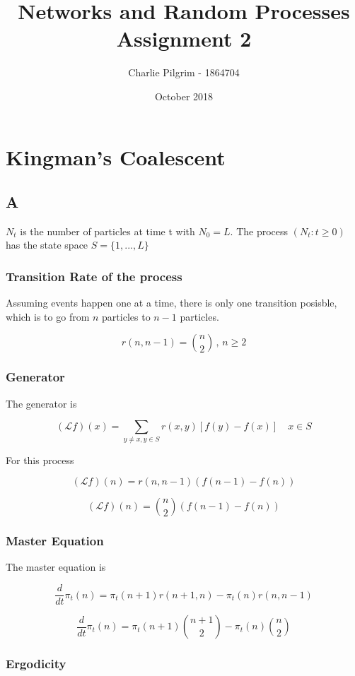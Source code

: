 \documentclass{article}
\title{Networks and Random Processes Assignment 2}
\author{Charlie Pilgrim - 1864704}
\date{October 2018}
\begin{document}
\maketitle


\section{Kingman's Coalescent}

\subsection{A}

$N_t$ is the number of particles at time t with $N_0=L$. The process $(N_t : t \geq 0)$ has the state space $S = \{1,...,L\}$

\subsubsection{Transition Rate of the process}

Assuming events happen one at a time, there is only one transition posisble, which is to go from $n$ particles to $n-1$ particles. 

$$r(n,n-1) = {n\choose 2} \, , \, n \geq 2$$

\subsubsection{Generator}

The generator is

$$(\mathcal{L}f)(x) = \sum_{y \neq x , y \in S} r(x,y)[f(y)-f(x)] \quad x \in S$$

For this process

$$(\mathcal{L}f)(n) = r(n,n-1)(f(n-1)-f(n))$$

$$(\mathcal{L}f)(n) = {n\choose 2} (f(n-1)-f(n))$$

\subsubsection{Master Equation}

The master equation is

$$\frac{d}{dt} \pi_t(n) = \pi_t(n+1)r(n+1,n) - \pi_t(n)r(n,n-1)$$

$$\frac{d}{dt} \pi_t(n) = \pi_t(n+1){n+1\choose 2} - \pi_t(n) {n \choose 2}$$

\subsubsection{Ergodicity}
\end{document}

